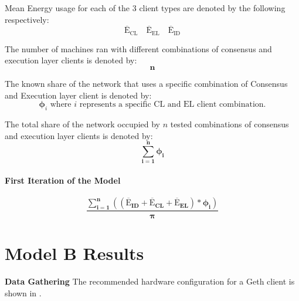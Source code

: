 Mean Energy usage for each of the 3 client types are denoted by the following respectively: 
\begin{equation*}
  \boldsymbol{\mathrm{{\overline{E}}_{CL}}}\quad      \boldsymbol{\mathrm{{\overline{E}}_{EL}}}\quad  \boldsymbol{\mathrm{{\overline{E}}_{ID}}}   
\end{equation*}

The number of machines ran with different combinations of consensus and execution layer clients is denoted by:
\begin{equation*}
    \boldsymbol{n}
\end{equation*}

The known share of the network that uses a specific combination of Consensus and Execution layer client is denoted by:
\begin{equation*}
    \boldsymbol{\phi}_{i} \text{ where } {i} \text{ represents a specific CL and EL client combination.}
\end{equation*}

The total share of the network occupied by ${n}$ tested combinations of consensus and execution layer clients is denoted by:
\begin{equation*}
    \boldsymbol{\displaystyle\sum\limits_{i=1}^{n}{\phi_{i}}}
\end{equation*}

\paragraph{First Iteration of the Model}

\begin{equation}
\boldsymbol{\frac{\displaystyle\sum\limits_{i=1}^{n}{ \left({\left(\mathrm{\overline{E}}_{ID} + \mathrm{\overline{E}}_{CL} + \mathrm{\overline{E}}_{EL}\right)} * {\phi_{i}} \right)}}
 {\pi}}
\end{equation}



\section{Model B Results}

\textbf{Data Gathering}
The recommended hardware configuration for a Geth client is shown in .

